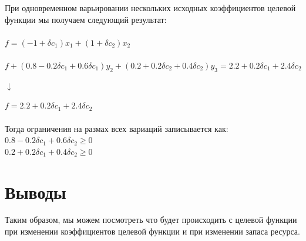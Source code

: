\documentclass[14pt,a4paper,fleqn]{extarticle}
\begin{document}
При одновременном варьировании нескольких исходных коэффициентов целевой функции мы получаем следующий результат:\\\\
$f = (-1 + \delta c_1)x_1 + (1 + \delta c_2)x_2$\\\\
\small $f + (0.8 - 0.2\delta c_1 + 0.6\delta c_1)y_2 + (0.2 + 0.2\delta c_2 + 0.4\delta c_2)y_3 = 2.2 + 0.2\delta c_1 + 2.4\delta c_2$
\begin{center}
	$\downarrow$
\end{center}
\normalsize$f = 2.2 + 0.2\delta c_1 + 2.4\delta c_2$\\\\
Тогда ограничения на размах всех вариаций записывается как:\\
$0.8 - 0.2\delta c_1 + 0.6\delta c_2 \geq 0$\\
$0.2 + 0.2\delta c_1 + 0.4\delta c_2 \geq 0$
\section*{Выводы}
Таким образом, мы можем посмотреть что будет происходить с целевой функции при изменении коэффициентов целевой функции и при изменении запаса ресурса.
\end{document}
